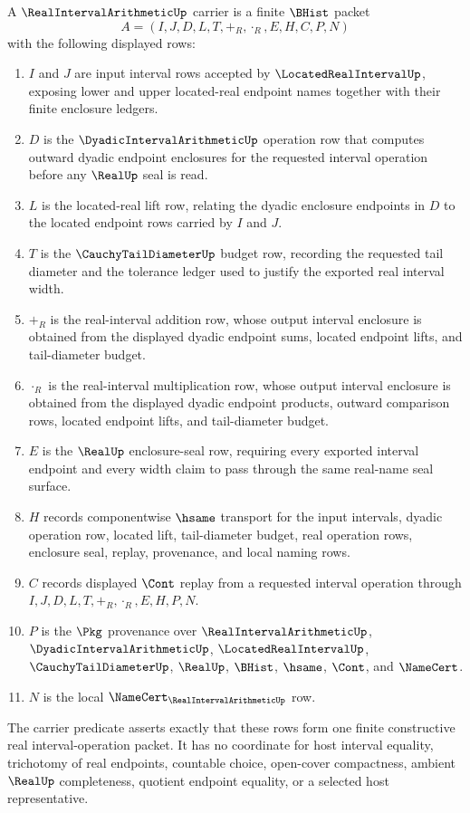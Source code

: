 \begin{definition}
\label{def:real-interval-arithmetic-carrier}
A $\RealIntervalArithmeticUp$ carrier is a finite $\BHist$ packet
$$
A=(I,J,D,L,T,+_R,\cdot_R,E,H,C,P,N)
$$
with the following displayed rows:
\begin{enumerate}
\item $I$ and $J$ are input interval rows accepted by $\LocatedRealIntervalUp$, exposing lower and upper located-real endpoint names together with their finite enclosure ledgers.
\item $D$ is the $\DyadicIntervalArithmeticUp$ operation row that computes outward dyadic endpoint enclosures for the requested interval operation before any $\RealUp$ seal is read.
\item $L$ is the located-real lift row, relating the dyadic enclosure endpoints in $D$ to the located endpoint rows carried by $I$ and $J$.
\item $T$ is the $\CauchyTailDiameterUp$ budget row, recording the requested tail diameter and the tolerance ledger used to justify the exported real interval width.
\item $+_R$ is the real-interval addition row, whose output interval enclosure is obtained from the displayed dyadic endpoint sums, located endpoint lifts, and tail-diameter budget.
\item $\cdot_R$ is the real-interval multiplication row, whose output interval enclosure is obtained from the displayed dyadic endpoint products, outward comparison rows, located endpoint lifts, and tail-diameter budget.
\item $E$ is the $\RealUp$ enclosure-seal row, requiring every exported interval endpoint and every width claim to pass through the same real-name seal surface.
\item $H$ records componentwise $\hsame$ transport for the input intervals, dyadic operation row, located lift, tail-diameter budget, real operation rows, enclosure seal, replay, provenance, and local naming rows.
\item $C$ records displayed $\Cont$ replay from a requested interval operation through $I,J,D,L,T,+_R,\cdot_R,E,H,P,N$.
\item $P$ is the $\Pkg$ provenance over $\RealIntervalArithmeticUp$, $\DyadicIntervalArithmeticUp$, $\LocatedRealIntervalUp$, $\CauchyTailDiameterUp$, $\RealUp$, $\BHist$, $\hsame$, $\Cont$, and $\NameCert$.
\item $N$ is the local $\NameCert_{\RealIntervalArithmeticUp}$ row.
\end{enumerate}
The carrier predicate asserts exactly that these rows form one finite constructive real interval-operation packet. It has no coordinate for host interval equality, trichotomy of real endpoints, countable choice, open-cover compactness, ambient $\RealUp$ completeness, quotient endpoint equality, or a selected host representative.
\end{definition}

